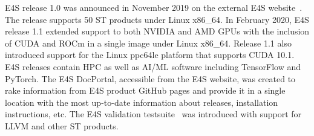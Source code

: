 E4S release 1.0 was announced in November 2019 on the external E4S website~\cite{e4s:homepage}. The release supports 50 ST products under Linux x86\_64. In February 2020, E4S release 1.1 extended support to both NVIDIA and AMD GPUs with the inclusion of CUDA and ROCm in a single image under Linux x86\_64. Release 1.1 also introduced support for the Linux ppc64le platform that supports CUDA 10.1. E4S releases contain HPC as well as AI/ML software including TensorFlow and PyTorch. The E4S DocPortal, accessible from the E4S website, was created to rake information from E4S product GitHub pages and provide it in a single location with the most up-to-date information about releases, installation instructions, etc. The E4S validation testsuite~\cite{e4s:validation} was introduced with support for LLVM and other ST products.

